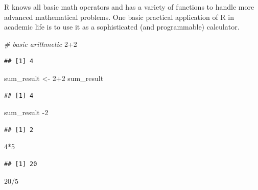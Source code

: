 \documentclass[
  12pt,
]{style/krantz}
\newenvironment{Shaded}{\begin{snugshade}}{\end{snugshade}}
\newcommand{\CommentTok}[1]{\textcolor[rgb]{0.56,0.35,0.01}{\textit{#1}}}
\newcommand{\DecValTok}[1]{\textcolor[rgb]{0.00,0.00,0.81}{#1}}
\newcommand{\NormalTok}[1]{#1}
\newcommand{\OtherTok}[1]{\textcolor[rgb]{0.56,0.35,0.01}{#1}}
\newcommand{\SpecialCharTok}[1]{\textcolor[rgb]{0.00,0.00,0.00}{#1}}
\begin{document}
R knows all basic math operators and has a variety of functions to handle more advanced mathematical problems. One basic practical application of R in academic life is to use it as a sophisticated (and programmable) calculator.

\begin{Shaded}
\begin{Highlighting}[]
\CommentTok{\# basic arithmetic }
\DecValTok{2}\SpecialCharTok{+}\DecValTok{2}
\end{Highlighting}
\end{Shaded}

\begin{verbatim}
## [1] 4
\end{verbatim}

\begin{Shaded}
\begin{Highlighting}[]
\NormalTok{sum\_result }\OtherTok{\textless{}{-}} \DecValTok{2}\SpecialCharTok{+}\DecValTok{2}
\NormalTok{sum\_result}
\end{Highlighting}
\end{Shaded}

\begin{verbatim}
## [1] 4
\end{verbatim}

\begin{Shaded}
\begin{Highlighting}[]
\NormalTok{sum\_result }\SpecialCharTok{{-}}\DecValTok{2}
\end{Highlighting}
\end{Shaded}

\begin{verbatim}
## [1] 2
\end{verbatim}

\begin{Shaded}
\begin{Highlighting}[]
\DecValTok{4}\SpecialCharTok{*}\DecValTok{5}
\end{Highlighting}
\end{Shaded}

\begin{verbatim}
## [1] 20
\end{verbatim}

\begin{Shaded}
\begin{Highlighting}[]
\DecValTok{20}\SpecialCharTok{/}\DecValTok{5}
\end{Highlighting}
\end{Shaded}
\end{document}
